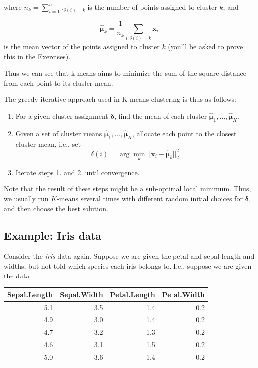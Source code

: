 \documentclass[
]{book}
\theoremstyle{definition}
\theoremstyle{definition}
\theoremstyle{definition}
\theoremstyle{definition}
\theoremstyle{remark}
\begin{document}
where \(n_k = \sum_{i=1}^n \mathbb{I}_{\delta(i)=k}\) is the number of points assigned to cluster \(k\), and

\[\hat{{\boldsymbol{\mu}}}_k=\frac{1}{n_k}\sum_{i: \delta(i)=k} \mathbf x_i\]
is the mean vector of the points assigned to cluster \(k\) (you'll be asked to prove this in the Exercises).

Thus we can see that k-means aims to minimize the sum of the square distance from each point to its cluster mean.

The greedy iterative approach used in K-means clustering is thus as follows:

\begin{enumerate}
\def\labelenumi{\arabic{enumi}.}
\item
  For a given cluster assignment \(\boldsymbol \delta\), find the mean of each cluster \(\hat{{\boldsymbol{\mu}}}_1, \ldots, \hat{{\boldsymbol{\mu}}}_K\).
\item
  Given a set of cluster means \(\hat{{\boldsymbol{\mu}}}_1, \ldots, \hat{{\boldsymbol{\mu}}}_K\), allocate each point to the closest cluster mean, i.e., set
  \[\delta(i) = \arg \min_k ||\mathbf x_i - \hat{{\boldsymbol{\mu}}}_k||_2^2\]
\item
  Iterate steps 1. and 2. until convergence.
\end{enumerate}

Note that the result of these steps might be a sub-optimal local minimum. Thus, we usually run \(K\)-means several times with different random initial choices for \(\boldsymbol \delta\), and then choose the best solution.

\subsection{Example: Iris data}\label{example-iris-data}

Consider the \emph{iris} data again. Suppose we are given the petal and sepal length and widths, but not told which species each iris belongs to. I.e., suppose we are given the data

\begin{table}
\centering
\begin{tabular}{rrrr}
\toprule
Sepal.Length & Sepal.Width & Petal.Length & Petal.Width\\
\midrule
5.1 & 3.5 & 1.4 & 0.2\\
4.9 & 3.0 & 1.4 & 0.2\\
4.7 & 3.2 & 1.3 & 0.2\\
4.6 & 3.1 & 1.5 & 0.2\\
5.0 & 3.6 & 1.4 & 0.2\\
\bottomrule
\end{tabular}
\end{table}
\end{document}
